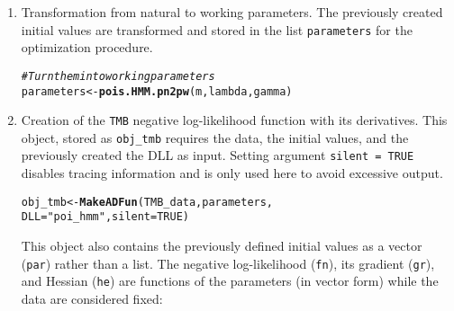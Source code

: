 \documentclass[bimj,fleqn]{w-art}\usepackage[]{graphicx}\usepackage[]{color}
\makeatletter
\newcommand{\hlnum}[1]{\textcolor[rgb]{0.686,0.059,0.569}{#1}}%
\newcommand{\hlstr}[1]{\textcolor[rgb]{0.192,0.494,0.8}{#1}}%
\newcommand{\hlcom}[1]{\textcolor[rgb]{0.678,0.584,0.686}{\textit{#1}}}%
\newcommand{\hlstd}[1]{\textcolor[rgb]{0.345,0.345,0.345}{#1}}%
\newcommand{\hlkwb}[1]{\textcolor[rgb]{0.69,0.353,0.396}{#1}}%
\newcommand{\hlkwc}[1]{\textcolor[rgb]{0.333,0.667,0.333}{#1}}%
\newcommand{\hlkwd}[1]{\textcolor[rgb]{0.737,0.353,0.396}{\textbf{#1}}}%
\newenvironment{kframe}{%
 \def\at@end@of@kframe{}%
 \ifinner\ifhmode%
  \def\at@end@of@kframe{\end{minipage}}%
  \begin{minipage}{\columnwidth}%
 \fi\fi%
 \def\FrameCommand##1{\hskip\@totalleftmargin \hskip-\fboxsep
 \colorbox{shadecolor}{##1}\hskip-\fboxsep
     \hskip-\linewidth \hskip-\@totalleftmargin \hskip\columnwidth}%
 \MakeFramed {\advance\hsize-\width
   \@totalleftmargin\z@ \linewidth\hsize
   \@setminipage}}%
 {\par\unskip\endMakeFramed%
 \at@end@of@kframe}
\newenvironment{knitrout}{}{} %
\theoremstyle{plain}
\theoremstyle{definition}
\makeatother
\begin{document}
\begin{enumerate}
\item Transformation from natural to working parameters. The previously created initial values are transformed and stored in the list {\tt parameters} for the optimization procedure.
\begin{knitrout}
\color{fgcolor}\begin{kframe}
\begin{alltt}
\hlcom{# Turn them into working parameters}
\hlstd{parameters} \hlkwb{<-} \hlkwd{pois.HMM.pn2pw}\hlstd{(m, lambda, gamma)}
\end{alltt}
\end{kframe}
\end{knitrout}

\item Creation of the \texttt{TMB} negative log-likelihood function with its derivatives. This object, stored as \texttt{obj\_tmb} requires the data, the initial values, and the previously created the DLL as input. Setting argument \texttt{silent = TRUE} disables tracing information and is only used here to avoid excessive output.

\begin{knitrout}
\color{fgcolor}\begin{kframe}
\begin{alltt}
\hlstd{obj_tmb} \hlkwb{<-} \hlkwd{MakeADFun}\hlstd{(TMB_data, parameters,}
                     \hlkwc{DLL} \hlstd{=} \hlstr{"poi_hmm"}\hlstd{,} \hlkwc{silent} \hlstd{=} \hlnum{TRUE}\hlstd{)}
\end{alltt}
\end{kframe}
\end{knitrout}

This object also contains the previously defined initial values as a vector (\texttt{par}) rather than a list. The negative log-likelihood (\texttt{fn}), its gradient (\texttt{gr}), and Hessian (\texttt{he}) are functions of the parameters (in vector form) while the data are considered fixed: 


\end{enumerate}
\end{document}
